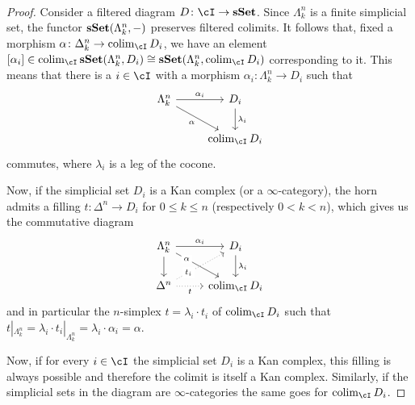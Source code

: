 \documentclass[a4paper,11pt,openany]{scrartcl}
\begin{document}
~\\
\begin{proof}
    Consider a filtered diagram $D\colon\cI\rightarrow\sSet$.
    Since $\Lambda^n_k$ is a finite simplicial set, the functor
    $\operatorname{\mathbf{sSet}}(\Lambda^n_k,-)$ preserves
    filtered colimits. It follows that, fixed a morphism
    $\alpha\colon\Delta^n_k\rightarrow\colim_{\cI}D_i$, we have an element
    $[\alpha_i]\in\colim_{\cI}\sSet(\Lambda^n_k,D_i)\cong\sSet(\Lambda^n_k,\colim_{\cI}D_i)$
    corresponding to it. This means that there is a $i\in\cI$ with a morphism
    $\alpha_i\colon\Lambda^n_k\rightarrow D_i$ such that
    \[\begin{tikzcd}
        {\Lambda^n_k} & {D_i} \\
        {} & {\colim_{\cI}D_i}
        \arrow["{\lambda_i}", from=1-2, to=2-2]
        \arrow["{\alpha_i}", from=1-1, to=1-2]
        \arrow["\alpha"', from=1-1, to=2-2]
    \end{tikzcd}\]
    commutes, where $\lambda_i$ is a leg of the cocone.

    Now, if the simplicial set $D_i$ is a Kan complex (or a
    $\infty$-category), the horn admits a
    filling $t\colon\Delta^n\rightarrow D_i$ for $0\leq k\leq n$ (respectively
    $0<k<n$), which gives us the commutative diagram
    \[\begin{tikzcd}
        {\Lambda^n_k} & {D_i} \\
        {\Delta^n} & {\colim_{\cI}D_i}
        \arrow["{\lambda_i}", from=1-2, to=2-2]
        \arrow["{\alpha_i}", from=1-1, to=1-2]
        \arrow["\alpha"{description, pos=0.25}, from=1-1, to=2-2]
        \arrow["t"', dotted, from=2-1, to=2-2]
        \arrow[from=1-1, to=2-1]
        \arrow["{t_i}"{description, pos=0.25}, dotted, from=2-1, to=1-2]
    \end{tikzcd}\]
    and in particular the $n$-simplex $t=\lambda_i\cdot t_i$ of
    $\colim_{\cI}D_i$ such that $t|_{\Lambda^n_k}=\lambda_i\cdot
    t_i|_{\Lambda^n_k}=\lambda_i\cdot\alpha_i=\alpha$.

    Now, if for every $i\in\cI$ the simplicial set $D_i$ is a Kan complex, this
    filling is always possible and therefore the colimit is itself a Kan
    complex. Similarly, if the simplicial sets in the diagram are
    $\infty$-categories the same goes for $\colim_{\cI}D_i$.
\end{proof}
\end{document}
